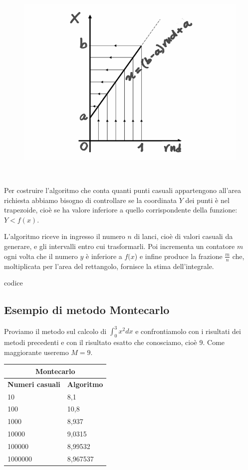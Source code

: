 \documentclass{article}
\begin{document}
\begin{figure}[ht]
\centering
\includegraphics[scale=0.25]{img/09_07_f_rnd.png} 
\label{fig:RandomTransform}
\end{figure}\

Per costruire l’algoritmo che conta quanti punti casuali appartengono all’area richiesta abbiamo bisogno di controllare se la coordinata $Y$ dei punti è nel trapezoide, cioè se ha valore inferiore a quello corrispondente della funzione: $Y<f(x)$.

L’algoritmo riceve in ingresso il numero $n$ di lanci, cioè di valori casuali da generare, e gli intervalli entro cui trasformarli. Poi incrementa un contatore $m$ ogni volta che il numero $y$ è inferiore a $f(x$) e infine produce la frazione $\frac{m}{n}$ che, moltiplicata per l’area del rettangolo, fornisce la stima dell’integrale.

codice

\subsection{Esempio di metodo Montecarlo}

Proviamo il metodo sul calcolo di $\int_0^3 x^2dx$ e confrontiamolo con i risultati dei metodi precedenti e con il risultato esatto che conosciamo, cioè 9. Come maggiorante useremo $M=9$.

\hfill

\begin{tabular}{ |p{3cm}||p{3cm}|}
 \hline
 \multicolumn{2}{|c|}{Montecarlo} \\
 \hline
 \textbf{Numeri casuali}& \textbf{Algoritmo}\\
 \hline
10  & 8,1   \\
 100&   10,8 \\
 1000 &8,937\\
 10000    & 9,0315 \\
 100000&   8,99532 \\
 1000000& 8,967537 \\
 \hline
\end{tabular}
\end{document}
